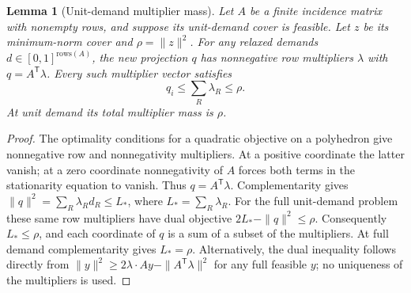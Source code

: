 \documentclass[11pt]{article}
\newtheorem{lemma}[theorem]{Lemma}
\theoremstyle{definition}
\theoremstyle{remark}
\begin{document}
\begin{lemma}[Unit-demand multiplier mass]
\label{lem:dual-mass}
Let $A$ be a finite incidence matrix with nonempty rows, and suppose its
unit-demand cover is feasible.  Let $z$ be its minimum-norm cover and
$\rho=\|z\|^2$.  For any relaxed demands $d\in[0,1]^{\mathrm{rows}(A)}$,
the new projection $q$ has nonnegative row multipliers $\lambda$ with
$q=A^\mathsf T\lambda$.  Every such multiplier vector satisfies
\[
 q_i\le\sum_R\lambda_R\le\rho.
\]
At unit demand its total multiplier mass is $\rho$.
\end{lemma}
\begin{proof}
The optimality conditions for a quadratic objective on a polyhedron give
nonnegative row and nonnegativity multipliers.  At a positive coordinate
the latter vanish; at a zero coordinate nonnegativity of $A$ forces both
terms in the stationarity equation to vanish.  Thus $q=A^\mathsf T\lambda$.
Complementarity gives $\|q\|^2=\sum_R\lambda_R d_R\le L_*$, where
$L_*=\sum_R\lambda_R$.  For the full unit-demand problem these same row
multipliers have dual objective $2L_*-\|q\|^2\le\rho$.  Consequently
$L_*\le\rho$, and each coordinate of $q$ is a sum of a subset of the
multipliers.  At full demand complementarity gives $L_*=\rho$.
Alternatively, the dual inequality follows directly from
$\|y\|^2\ge2\lambda\cdot Ay-\|A^\mathsf T\lambda\|^2$ for any full
feasible $y$; no uniqueness of the multipliers is used.
\end{proof}
\end{document}
